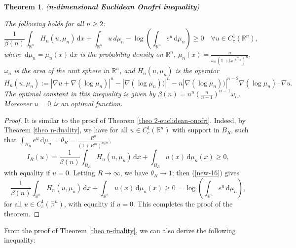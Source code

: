 \documentclass[10pt]{article}
\numberwithin{equation}{section}
\theoremstyle{plain}
\newtheorem{thm}{Theorem}[section]
\theoremstyle{definition}
\theoremstyle{remark}
\newcommand\R{{\mathbb R}}
\newcommand{\ib}{\int_{B_R}}
\newcommand\dd{\,\mbox{d} }
\begin{document}
\begin{thm} ({\bf n-dimensional Euclidean Onofri inequality})\label{theo n-euclidean-onofri}

The following  
holds for all $n\geq 2$:
\begin{equation}\label{Ln onofri}
\frac{1}{\beta (n)}\int_{\R^n} H_n(u,\mu_n) \dd x  +  \int_{\R^n}u\, d\mu_n - \log\left(\int_{\R^n} e^u\,\mbox{d}\mu_n\right)   \geq 0  \quad \forall u\in C^1_c(\R^n),
\end{equation}
where $\dd \mu_n=\mu_n(x)\dd x$ is the probability density on $\R^n$, $\mu_n(x)= \frac{n}{\omega_n (1+|x|^\frac{n}{n-1})^n}$,
$\omega_n$ is the area of the unit sphere in $\R^n$, and $H_n(u,\mu_n)$ is the operator
\[H_n(u,\mu_n):=|\nabla u +\nabla(\log\mu_n)|^n - |\nabla(\log\mu_n))|^n - n |\nabla(\log\mu_n))|^{n-2}\nabla(\log\mu_n) \cdot \nabla u.\]
The optimal constant in this inequality is given by $\beta (n)=n^n (\frac{n}{n-1})^{n-1} \omega_n$.
Moreover $u=0$ is an optimal function.
\end{thm}

\begin{proof}
It is similar to the proof of Theorem \ref{theo 2-euclidean-onofri}. Indeed, by Theorem \ref{theo n-duality}, we have for all $u\in C^1_c(\R^n)$ with support in $B_R$, such that $\ib e^u\dd\mu_n =\theta_R=\frac{R^n}{(1+R^m)^{n/m}}$,
\begin{equation}\label{new-16}
I_R(u) =  \frac{1}{\beta(n)} \int_{B_R} H_n(u,\mu_n)\dd x + \int_{B_R} u(x)\dd \mu_n(x) \geq 0,
\end{equation}
with equality if $u=0$. Letting $R\to\infty$, we have $\theta_R\to 1$; then (\ref{new-16}) gives
\[\frac{1}{\beta(n)} \int_{\R^n} H_n(u,\mu_n)\dd x + \int_{\R^n} u(x)\dd \mu_n(x) \geq 0 = \log\left(\int_{\R^n} e^u\dd\mu_n\right),\]
for all $u\in C^1_c(\R^n)$, with equality if $u=0$. This completes the proof of the theorem.
\end{proof}
From the proof of Theorem  \ref{theo n-duality}, we can also derive the following inequality:
\end{document}
